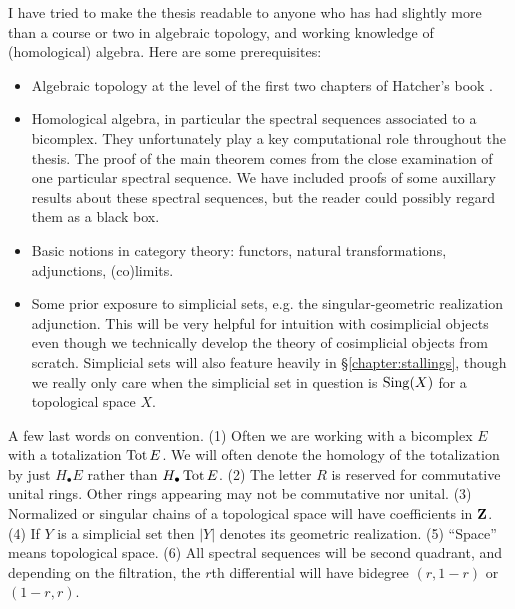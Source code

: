 I have tried to make the thesis readable to anyone who has had slightly more than a course or two in algebraic topology, and working knowledge of (homological) algebra. Here are some prerequisites:
\begin{itemize}
\item Algebraic topology at the level of the first two chapters of Hatcher's book \cite{Hatcher:478079}.
\item Homological algebra, in particular the spectral sequences associated to a bicomplex. They unfortunately play a key computational role throughout the thesis. The proof of the main theorem comes from the close examination of one particular spectral sequence. We have included proofs of some auxillary results about these spectral sequences, but the reader could possibly regard them as a black box.
\item Basic notions in category theory: functors, natural transformations, adjunctions, (co)limits. 
\item Some prior exposure to simplicial sets, e.g. the singular-geometric realization adjunction. This will be very helpful for intuition with cosimplicial objects even though we technically develop the theory of cosimplicial objects from scratch. Simplicial sets will also feature heavily in \S\ref{chapter:stallings}, though we really only care when the simplicial set in question is $\operatorname{Sing}(X)$ for a topological space $X$.
\end{itemize}

A few last words on convention. (1) Often we are working with a bicomplex $E$ with a totalization $\operatorname{Tot} E$. We will often denote the homology of the totalization by just $H_\bullet E$ rather than $H_\bullet\operatorname{Tot} E$. (2) The letter $R$ is reserved for commutative unital rings. Other rings appearing may not be commutative nor unital. (3) Normalized or singular chains of a topological space will have coefficients in $\mathbf{Z}$. (4) If $Y$ is a simplicial set then $|Y|$ denotes its geometric realization. (5) ``Space'' means topological space. (6) All spectral sequences will be second quadrant, and depending on the filtration, the $r$th differential will have bidegree $(r, 1-r)$ or $(1-r, r)$. 